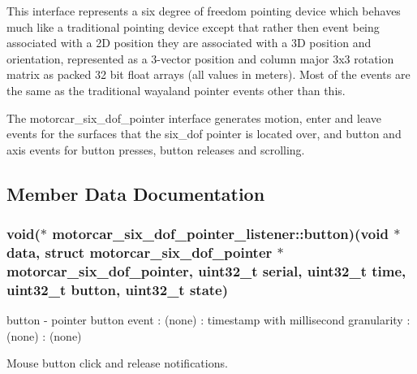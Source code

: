 This interface represents a six degree of freedom pointing device which behaves much like a traditional pointing device except that rather then event being associated with a 2\-D position they are associated with a 3\-D position and orientation, represented as a 3-\/vector position and column major 3x3 rotation matrix as packed 32 bit float arrays (all values in meters). Most of the events are the same as the traditional wayaland pointer events other than this.

The motorcar\-\_\-six\-\_\-dof\-\_\-pointer interface generates motion, enter and leave events for the surfaces that the six\-\_\-dof pointer is located over, and button and axis events for button presses, button releases and scrolling. 

\subsection{Member Data Documentation}
\hypertarget{structmotorcar__six__dof__pointer__listener_a768d27906b6a34cbe6069bf830f3efdd}{
\subsubsection[{button}]{\setlength{\rightskip}{0pt plus 5cm}void($\ast$ motorcar\-\_\-six\-\_\-dof\-\_\-pointer\-\_\-listener\-::button)(void $\ast$data, struct motorcar\-\_\-six\-\_\-dof\-\_\-pointer $\ast$motorcar\-\_\-six\-\_\-dof\-\_\-pointer, uint32\-\_\-t serial, uint32\-\_\-t time, uint32\-\_\-t button, uint32\-\_\-t state)}}\label{structmotorcar__six__dof__pointer__listener_a768d27906b6a34cbe6069bf830f3efdd}
button -\/ pointer button event \-: (none) \-: timestamp with millisecond granularity \-: (none) \-: (none)

Mouse button click and release notifications.

